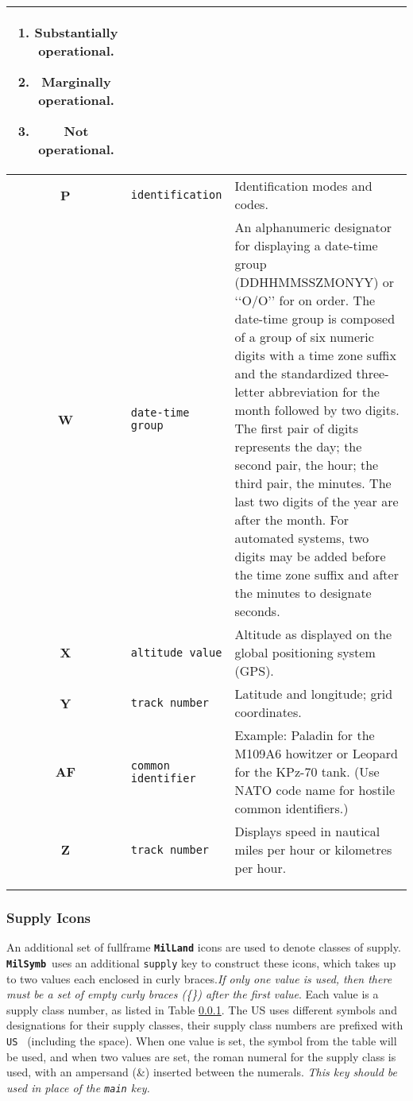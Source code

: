 \documentclass[a4paper, titlepage]{article}
\newcommand\MilSymb{\textbf{\texttt{MilSymb}}}
\begin{document}
\begin{center}
\begin{tabularx}{\textwidth}{|c|l|X|}
\begin{enumerate}[label=\arabic*., align=left]
\item Substantially operational.
\item Marginally operational.
\item Not operational.
\end{enumerate} \\ \hline
\textbf{P} & \texttt{identification} & Identification modes and codes.\\ \hline
\textbf{W} & \texttt{date-time group} & An alphanumeric designator for displaying a date-time group (DDHHMMSSZMONYY) or \lq\lq{}O/O\rq\rq{} for on order. The date-time group is composed of a group of six numeric digits with a time zone suffix and the standardized three-letter abbreviation for the month followed by two digits. The first pair of digits represents the day; the second pair, the hour; the third pair, the minutes. The last two digits of the year are after the month. For automated systems, two digits may be added before the time zone suffix and after the minutes to designate seconds.\\ \hline
\textbf{X} & \texttt{altitude value} & Altitude as displayed on the global positioning system (GPS). \\ \hline
\textbf{Y} & \texttt{track number} & Latitude and longitude; grid coordinates. \\ \hline
\textbf{AF} & \texttt{common identifier} & Example: Paladin for the M109A6 howitzer or Leopard for the KPz-70 tank. (Use NATO code name for hostile common identifiers.) \\ \hline
\textbf{Z} & \texttt{track number} & Displays speed in nautical miles per hour or kilometres per hour. \\ \hline
\multicolumn{3}{c}{}\\
\caption{Description of \textbf{\texttt{MilLand}} text field amplifiers.}
\label{airtexttable}
\end{tabularx}
\end{center}

\subsubsection{Supply Icons}

An additional set of fullframe \textbf{\texttt{MilLand}} icons are used to denote classes of supply. \MilSymb\ uses an additional \texttt{supply} key to construct these icons, which takes up to two values each enclosed in curly braces.\textit{If only one value is used, then there must be a set of empty curly braces (\{\}) after the first value}. Each value is a supply class number, as listed in Table \ref{}. The US uses different symbols and designations for their supply classes, their supply class numbers are prefixed with \texttt{US } (including the space). When one value is set, the symbol from the table will be used, and when two values are set, the roman numeral for the supply class is used, with an ampersand (\&) inserted between the numerals. \textit{This key should be used in place of the \texttt{main} key.}
\end{document}
